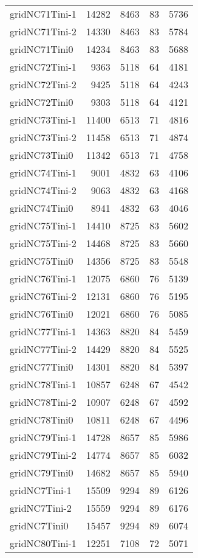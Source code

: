 \begin{longtable}{lrrrr}
gridNC71Tini-1 & 14282 & 8463 & 83 & 5736 \\
gridNC71Tini-2 & 14330 & 8463 & 83 & 5784 \\
gridNC71Tini0 & 14234 & 8463 & 83 & 5688 \\
gridNC72Tini-1 & 9363 & 5118 & 64 & 4181 \\
gridNC72Tini-2 & 9425 & 5118 & 64 & 4243 \\
gridNC72Tini0 & 9303 & 5118 & 64 & 4121 \\
gridNC73Tini-1 & 11400 & 6513 & 71 & 4816 \\
gridNC73Tini-2 & 11458 & 6513 & 71 & 4874 \\
gridNC73Tini0 & 11342 & 6513 & 71 & 4758 \\
gridNC74Tini-1 & 9001 & 4832 & 63 & 4106 \\
gridNC74Tini-2 & 9063 & 4832 & 63 & 4168 \\
gridNC74Tini0 & 8941 & 4832 & 63 & 4046 \\
gridNC75Tini-1 & 14410 & 8725 & 83 & 5602 \\
gridNC75Tini-2 & 14468 & 8725 & 83 & 5660 \\
gridNC75Tini0 & 14356 & 8725 & 83 & 5548 \\
gridNC76Tini-1 & 12075 & 6860 & 76 & 5139 \\
gridNC76Tini-2 & 12131 & 6860 & 76 & 5195 \\
gridNC76Tini0 & 12021 & 6860 & 76 & 5085 \\
gridNC77Tini-1 & 14363 & 8820 & 84 & 5459 \\
gridNC77Tini-2 & 14429 & 8820 & 84 & 5525 \\
gridNC77Tini0 & 14301 & 8820 & 84 & 5397 \\
gridNC78Tini-1 & 10857 & 6248 & 67 & 4542 \\
gridNC78Tini-2 & 10907 & 6248 & 67 & 4592 \\
gridNC78Tini0 & 10811 & 6248 & 67 & 4496 \\
gridNC79Tini-1 & 14728 & 8657 & 85 & 5986 \\
gridNC79Tini-2 & 14774 & 8657 & 85 & 6032 \\
gridNC79Tini0 & 14682 & 8657 & 85 & 5940 \\
gridNC7Tini-1 & 15509 & 9294 & 89 & 6126 \\
gridNC7Tini-2 & 15559 & 9294 & 89 & 6176 \\
gridNC7Tini0 & 15457 & 9294 & 89 & 6074 \\
gridNC80Tini-1 & 12251 & 7108 & 72 & 5071 \\

\end{longtable}
